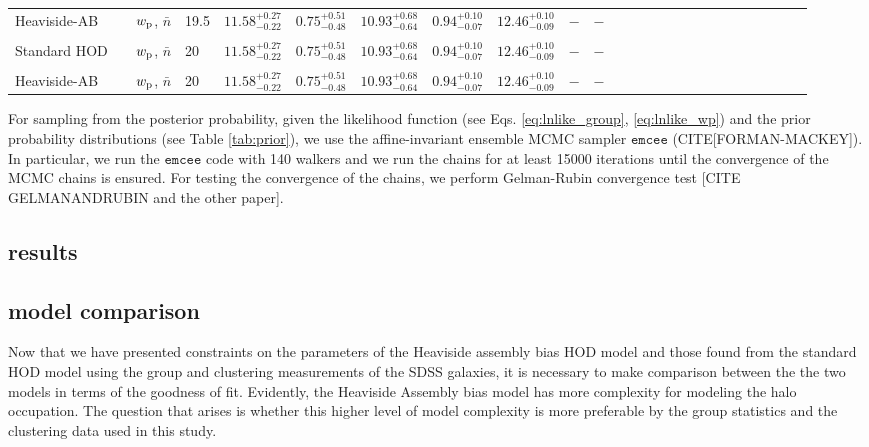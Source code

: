 \documentclass[12pt, preprint]{emulateapj}
\newcommand{\wpp}{w_{\rm p}}
\begin{document}
\begin{table*}
\begin{center}
\begin{tabular}{@{}lllllllllllllllllllllllll}
Heaviside-AB & & $\wpp$, $\bar{n}$ & 19.5 & $11.58^{+0.27}_{-0.22}$ &  $0.75^{+0.51}_{-0.48}$ & $10.93^{+0.68}_{-0.64}$ & $0.94^{+0.10}_{-0.07}$ &  $12.46^{+0.10}_{-0.09}$ & $-$ & $-$ \\ \\
Standard HOD & & $\wpp$, $\bar{n}$ & 20 & $11.58^{+0.27}_{-0.22}$ &  $0.75^{+0.51}_{-0.48}$ & $10.93^{+0.68}_{-0.64}$ & $0.94^{+0.10}_{-0.07}$ &  $12.46^{+0.10}_{-0.09}$ & $-$ & $-$ \\ \\
Heaviside-AB & & $\wpp$, $\bar{n}$ & 20 & $11.58^{+0.27}_{-0.22}$ &  $0.75^{+0.51}_{-0.48}$ & $10.93^{+0.68}_{-0.64}$ & $0.94^{+0.10}_{-0.07}$ &  $12.46^{+0.10}_{-0.09}$ & $-$ & $-$ \\ 
                 
 \hline
  \end{tabular}
\end{center}
\end{table*}


For sampling from the posterior probability, given the likelihood function (see Eqs. \ref{eq:lnlike_group}, \ref{eq:lnlike_wp}) and the prior probability distributions (see Table \ref{tab:prior}), we use the affine-invariant ensemble MCMC sampler $\mathtt{emcee}$ (CITE[FORMAN-MACKEY]). In particular, we run the $\mathtt{emcee}$ code with 140 walkers and we run the chains for at least 15000 iterations until the convergence of the MCMC chains is ensured. For testing the convergence of the chains, we perform Gelman-Rubin convergence test [CITE GELMANANDRUBIN and the other paper].

\subsection{results}


\subsection{model comparison}

Now that we have presented constraints on the parameters of the Heaviside assembly bias HOD model and those found from the standard HOD model using the group and clustering measurements of the SDSS galaxies, it is necessary to make comparison between the the two models in terms of the goodness of fit. Evidently, the Heaviside Assembly bias model has more complexity for modeling the halo occupation. The question that arises is whether this higher level of model complexity is more preferable by the group statistics and the clustering data used in this study. 
\end{document}

